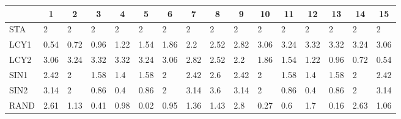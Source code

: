 \documentclass{tPRS2e}
\begin{document}
\begin{table}[h]
{	\begin{tabular}{l|lllllllllllllll}
		& \multicolumn{1}{c}{1} & \multicolumn{1}{c}{2} & \multicolumn{1}{c}{3} & \multicolumn{1}{c}{4} & \multicolumn{1}{c}{5} & \multicolumn{1}{c}{6} & \multicolumn{1}{c}{7} & \multicolumn{1}{c}{8} & \multicolumn{1}{c}{9} & \multicolumn{1}{c}{10} & \multicolumn{1}{c}{11} & \multicolumn{1}{c}{12} & \multicolumn{1}{c}{13} & \multicolumn{1}{c}{14} & \multicolumn{1}{c}{15} \\ \hline
		STA  & 2                     & 2                     & 2                     & 2                     & 2                     & 2                     & 2                     & 2                     & 2                     & 2                      & 2                      & 2                      & 2                      & 2                      & 2                      \\
		LCY1 & 0.54                  & 0.72                  & 0.96                  & 1.22                  & 1.54                  & 1.86                  & 2.2                   & 2.52                  & 2.82                  & 3.06                   & 3.24                   & 3.32                   & 3.32                   & 3.24                   & 3.06                   \\
		LCY2 & 3.06                  & 3.24                  & 3.32                  & 3.32                  & 3.24                  & 3.06                  & 2.82                  & 2.52                  & 2.2                   & 1.86                   & 1.54                   & 1.22                   & 0.96                   & 0.72                   & 0.54                   \\
		SIN1 & 2.42                  & 2                     & 1.58                  & 1.4                   & 1.58                  & 2                     & 2.42                  & 2.6                   & 2.42                  & 2                      & 1.58                   & 1.4                    & 1.58                   & 2                      & 2.42                   \\
		SIN2 & 3.14                  & 2                     & 0.86                  & 0.4                   & 0.86                  & 2                     & 3.14                  & 3.6                   & 3.14                  & 2                      & 0.86                   & 0.4                    & 0.86                   & 2                      & 3.14                   \\
		RAND & 2.61                  & 1.13                  & 0.41                  & 0.98                  & 0.02                  & 0.95                  & 1.36                  & 1.43                  & 2.8                   & 0.27                   & 0.6                    & 1.7                    & 0.16                   & 2.63                   & 1.06                   \\

\end{tabular}}
\end{table}
\end{document}
